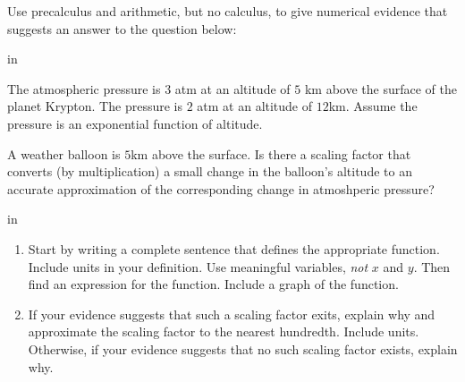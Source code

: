 \documentclass{ximera}
\newcommand{\pskip}{\vskip 0.1 in}
\begin{document}
\begin{question}  \label{Qdr3t3t3m}
Use precalculus and arithmetic, but no calculus, to give numerical evidence that suggests an answer to the question below:

\pskip

The atmospheric pressure is $3$ atm at an altitude of $5$ km above the surface of the planet Krypton. The pressure is $2$ atm at an altitude of $12$km. Assume the pressure is an exponential function of altitude.

A weather balloon is $5$km above the surface. Is there a scaling factor that converts (by multiplication) a small change in the balloon's altitude to an accurate approximation of the corresponding change in atmoshperic pressure?

\pskip

\begin{enumerate}

\item Start by writing a complete sentence that defines the appropriate function. Include units in your definition. Use meaningful variables, \emph{not} $x$ and $y$. Then find an expression for the function. Include a graph of the function. 


\item If your evidence suggests that such a scaling factor exits, explain why and approximate the scaling factor to the nearest hundredth. Include units. Otherwise, if your evidence suggests that no such scaling factor exists, explain why.

\end{enumerate}

\end{question}
\end{document}
